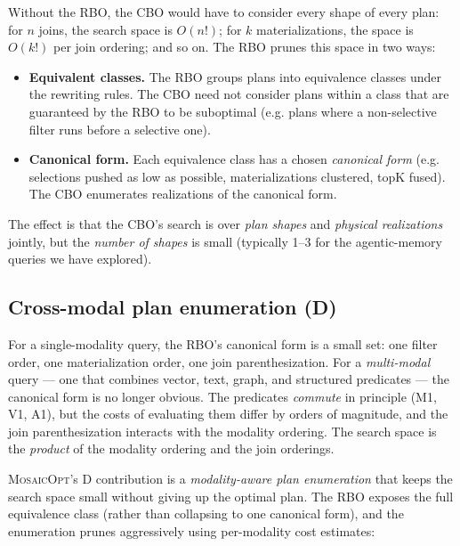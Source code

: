 \documentclass[sigconf,nonacm,review]{acmart}
\theoremstyle{plain}
\theoremstyle{definition}
\theoremstyle{remark}
\begin{document}
Without the RBO, the CBO would have to consider every shape of every
plan: for $n$ joins, the search space is $O(n!)$; for $k$
materializations, the space is $O(k!)$ per join ordering; and so on.
The RBO prunes this space in two ways:

\begin{itemize}[leftmargin=*]
  \item \textbf{Equivalent classes.} The RBO groups plans into
    equivalence classes under the rewriting rules. The CBO need not
    consider plans within a class that are guaranteed by the RBO to
    be suboptimal (e.g. plans where a non-selective filter runs
    before a selective one).
  \item \textbf{Canonical form.} Each equivalence class has a chosen
    \emph{canonical form} (e.g. selections pushed as low as possible,
    materializations clustered, topK fused). The CBO enumerates
    realizations of the canonical form.
\end{itemize}

The effect is that the CBO's search is over \emph{plan shapes} and
\emph{physical realizations} jointly, but the \emph{number of
shapes} is small (typically 1--3 for the agentic-memory queries we
have explored).

\subsection{Cross-modal plan enumeration (D)}\label{sec:rbo:crossmodal}

For a single-modality query, the RBO's canonical form is a small
set: one filter order, one materialization order, one join
parenthesization. For a \emph{multi-modal} query --- one that
combines vector, text, graph, and structured predicates ---
the canonical form is no longer obvious. The predicates
\emph{commute} in principle (M1, V1, A1), but the costs of
evaluating them differ by orders of magnitude, and the join
parenthesization interacts with the modality ordering. The
search space is the \emph{product} of the modality ordering
and the join orderings.

\textsc{MosaicOpt}'s D contribution is a \emph{modality-aware
plan enumeration} that keeps the search space small without
giving up the optimal plan. The RBO exposes the full equivalence
class (rather than collapsing to one canonical form), and the
enumeration prunes aggressively using per-modality cost estimates:
\end{document}
